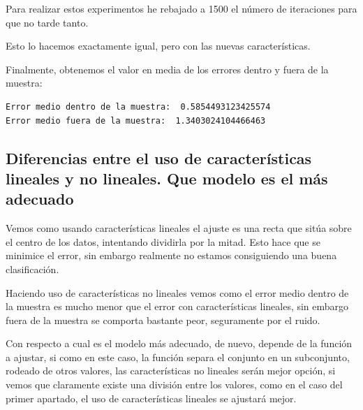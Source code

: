 \documentclass[12pt, spanish]{article}
\begin{document}
Para realizar estos experimentos he rebajado a 1500 el número de iteraciones para que no tarde tanto.

Esto lo hacemos exactamente igual, pero con las nuevas características.

Finalmente, obtenemos el valor en media de los errores dentro y fuera de la muestra:

\begin{lstlisting}
Error medio dentro de la muestra:  0.5854493123425574
Error medio fuera de la muestra:  1.3403024104466463
\end{lstlisting}



\subsection{Diferencias entre el uso de características lineales y no lineales. Que modelo es el más adecuado}

Vemos como usando características lineales el ajuste es una recta que sitúa sobre el centro de los datos, intentando dividirla por la mitad. Esto hace que se minimice el error, sin embargo realmente no estamos consiguiendo una buena clasificación.

Haciendo uso de características no lineales vemos como el error medio dentro de la muestra es mucho menor que el error con características lineales, sin embargo fuera de la muestra se comporta bastante peor, seguramente por el ruido.

Con respecto a cual es el modelo más adecuado, de nuevo, depende de la función a ajustar, si como en este caso, la función separa el conjunto en un subconjunto, rodeado de otros valores, las características no lineales serán mejor opción, si vemos que claramente existe una división entre los valores, como en el caso del primer apartado, el uso de características lineales se ajustará mejor.
\end{document}
